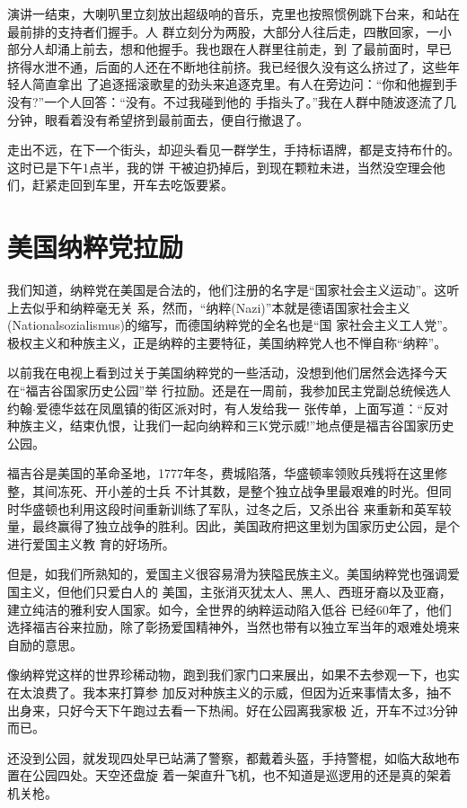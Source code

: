 ﻿\documentclass[11pt]{article}
\begin{document}
演讲一结束，大喇叭里立刻放出超级响的音乐，克里也按照惯例跳下台来，和站在最前排的支持者们握手。人
群立刻分为两股，大部分人往后走，四散回家，一小部分人却涌上前去，想和他握手。我也跟在人群里往前走，到
了最前面时，早已挤得水泄不通，后面的人还在不断地往前挤。我已经很久没有这么挤过了，这些年轻人简直拿出
了追逐摇滚歌星的劲头来追逐克里。有人在旁边问：``你和他握到手没有?''一个人回答：``没有。不过我碰到他的
手指头了。''我在人群中随波逐流了几分钟，眼看着没有希望挤到最前面去，便自行撤退了。

走出不远，在下一个街头，却迎头看见一群学生，手持标语牌，都是支持布什的。这时已是下午1点半，我的饼
干被迫扔掉后，到现在颗粒未进，当然没空理会他们，赶紧走回到车里，开车去吃饭要紧。

\section{美国纳粹党拉励}

我们知道，纳粹党在美国是合法的，他们注册的名字是``国家社会主义运动''。这听上去似乎和纳粹毫无关
系，然而，``纳粹(Nazi)''本就是德语国家社会主义(Nationalsozialismus)的缩写，而德国纳粹党的全名也是``国
家社会主义工人党''。极权主义和种族主义，正是纳粹的主要特征，美国纳粹党人也不惮自称``纳粹''。

以前我在电视上看到过关于美国纳粹党的一些活动，没想到他们居然会选择今天在``福吉谷国家历史公园''举
行拉励。还是在一周前，我参加民主党副总统候选人约翰$\cdot$爱德华兹在凤凰镇的街区派对时，有人发给我一
张传单，上面写道：``反对种族主义，结束仇恨，让我们一起向纳粹和三K党示威!''地点便是福吉谷国家历史公园。

福吉谷是美国的革命圣地，1777年冬，费城陷落，华盛顿率领败兵残将在这里修整，其间冻死、开小差的士兵
不计其数，是整个独立战争里最艰难的时光。但同时华盛顿也利用这段时间重新训练了军队，过冬之后，又杀出谷
来重新和英军较量，最终赢得了独立战争的胜利。因此，美国政府把这里划为国家历史公园，是个进行爱国主义教
育的好场所。

但是，如我们所熟知的，爱国主义很容易滑为狭隘民族主义。美国纳粹党也强调爱国主义，但他们只爱白人的
美国，主张消灭犹太人、黑人、西班牙裔以及亚裔，建立纯洁的雅利安人国家。如今，全世界的纳粹运动陷入低谷
已经60年了，他们选择福吉谷来拉励，除了彰扬爱国精神外，当然也带有以独立军当年的艰难处境来自励的意思。

像纳粹党这样的世界珍稀动物，跑到我们家门口来展出，如果不去参观一下，也实在太浪费了。我本来打算参
加反对种族主义的示威，但因为近来事情太多，抽不出身来，只好今天下午跑过去看一下热闹。好在公园离我家极
近，开车不过3分钟而已。

还没到公园，就发现四处早已站满了警察，都戴着头盔，手持警棍，如临大敌地布置在公园四处。天空还盘旋
着一架直升飞机，也不知道是巡逻用的还是真的架着机关枪。
\end{document}

